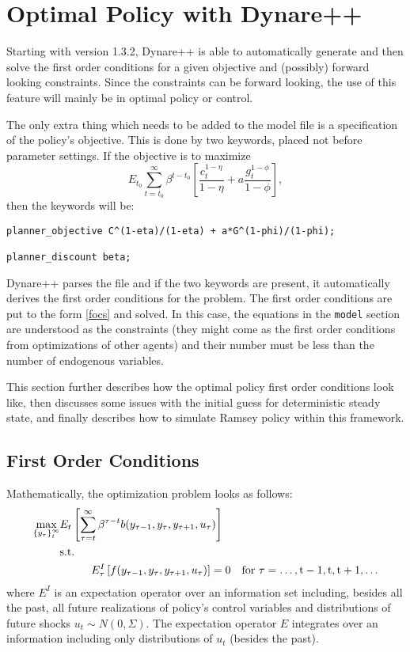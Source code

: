 \documentclass[10pt]{article}
\begin{document}
\section{Optimal Policy with Dynare++}
\label{optim}

Starting with version 1.3.2, Dynare++ is able to automatically
generate and then solve the first order conditions for a given
objective and (possibly) forward looking constraints. Since the
constraints can be forward looking, the use of this feature will
mainly be in optimal policy or control.

The only extra thing which needs to be added to the model file is a
specification of the policy's objective. This is done by two keywords,
placed not before parameter settings. If the objective is to maximize
$$E_{t_0}\sum_{t=t_0}^\infty\beta^{t-t_0}\left[\frac{c_t^{1-\eta}}{1-\eta}+
a\frac{g_t^{1-\phi}}{1-\phi}\right],$$
then the keywords will be:
{\small
\begin{verbatim}
planner_objective C^(1-eta)/(1-eta) + a*G^(1-phi)/(1-phi);

planner_discount beta;
\end{verbatim}
}

Dynare++ parses the file and if the two keywords are present, it
automatically derives the first order conditions for the problem. The
first order conditions are put to the form \eqref{focs} and solved. In
this case, the equations in the {\tt model} section are understood as
the constraints (they might come as the first order conditions from
optimizations of other agents) and their number must be less than the
number of endogenous variables.

This section further describes how the optimal policy first order
conditions look like, then discusses some issues with the initial
guess for deterministic steady state, and finally describes how to
simulate Ramsey policy within this framework.

\subsection{First Order Conditions}

Mathematically, the optimization problem looks as follows:
\begin{align}
\max_{\left\{y_\tau\right\}^\infty_t}&E_t
\left[\sum_{\tau=t}^\infty\beta^{\tau-t}b(y_{\tau-1},y_\tau,y_{\tau+1},u_\tau)\right]\notag\\
&\rm{s.t.}\label{planner_optim}\\
&\hskip1cm E^I_\tau\left[f(y_{\tau-1},y_\tau,y_{\tau+1},u_\tau)\right]=0\quad\rm{for\ }
\tau=\ldots,t-1,t,t+1,\ldots\notag
\end{align}
where $E^I$ is an expectation operator over an information set including,
besides all the past, all future realizations of policy's control
variables and distributions of future shocks $u_t\sim
N(0,\Sigma)$. The expectation operator $E$ integrates over an
information including only distributions of $u_t$ (besides the past).
\end{document}
